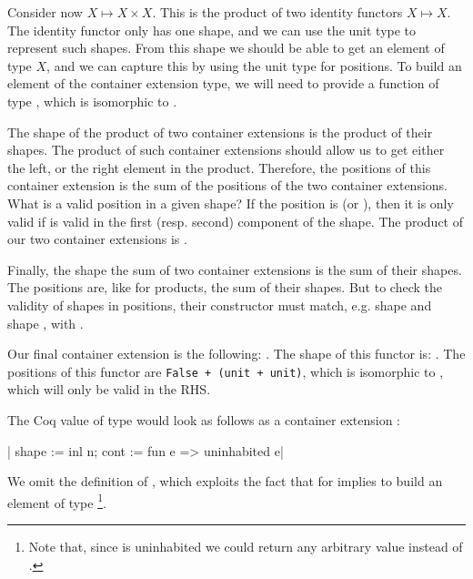 \documentclass[ a4paper, UKenglish, cleveref, autoref, thm-restate]{lipics-v2021}
\begin{document}
Consider now $X \mapsto X \times X$. This is the product of two
identity functors $X \mapsto X$. The identity functor only has one shape, and
we can use the unit type to represent such shapes. From this shape we should be
able to get an element of type $X$, and we can capture this by using the unit
type for positions. To build an element of the container extension type, we
will need to provide a function of type , which is
isomorphic to .

The shape of the product of two container extensions is the product of their
shapes. The product of such container extensions should allow us to get either
the left, or the right element in the product. Therefore, the positions of this
container extension is the sum of the positions of the two container
extensions. What is a valid position in a given shape? If the position is
 (or ), then it is only valid if
 is valid in the first (resp. second) component of the
shape. The product of our two container extensions is
.

Finally, the shape the sum of two container extensions is the sum of their
shapes. The positions are, like for products, the sum of their shapes. But to
check the validity of shapes in positions, their constructor must match, e.g.
shape  and shape , with
.

Our final container extension is the following:
.
The shape of this functor is:
. The positions of this functor
are \texttt{False + (unit + unit)}, which is isomorphic
to , which will only be valid in the RHS.

The Coq value  of type
 would look as follows as a container
extension
:
\begin{coqcode}
{| shape := inl n; cont := fun e => uninhabited e|}
\end{coqcode}
We omit the definition of , which exploits the
fact that  for  implies
 to build an element of type %
\footnote{Note that, since  is uninhabited we could return
any arbitrary value instead of .}.
\end{document}
